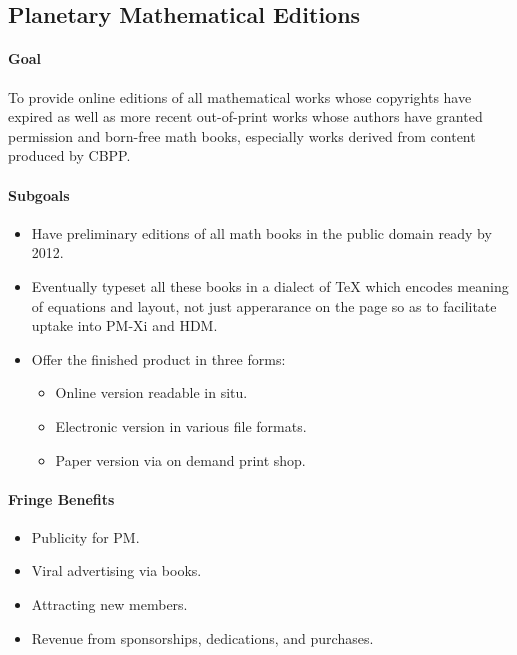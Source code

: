 \begin{itemize}
\begin{itemize}
\subsection{Planetary Mathematical Editions}

\paragraph{Goal} To provide online editions of all mathematical works whose
copyrights have expired as well as more recent out-of-print works whose
authors have granted permission and born-free math books, especially
works derived from content produced by CBPP.

\paragraph{Subgoals}

\begin{itemize}
\item
  Have preliminary editions of all math books in the public domain ready
  by 2012.
\item
  Eventually typeset all these books in a dialect of TeX which encodes
  meaning of equations and layout, not just apperarance on the page so
  as to facilitate uptake into PM-Xi and HDM.
\item
  Offer the finished product in three forms: 
  \begin{itemize}
  \item
    Online version readable in situ. 
  \item  
    Electronic version in various file formats. 
  \item  
    Paper version via on demand print shop.
  \end{itemize}  
\end{itemize}

\paragraph{Fringe Benefits}

\begin{itemize}
\item
  Publicity for PM.
\item
  Viral advertising via books.
\item
  Attracting new members.
\item
  Revenue from sponsorships, dedications, and purchases.
\end{itemize}


\end{itemize}
\end{itemize}
